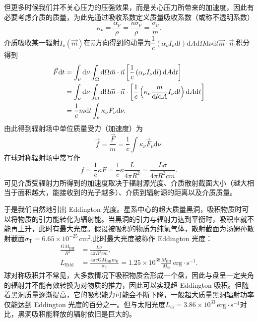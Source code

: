 \documentclass[../天体物理基础.tex]{subfiles}
\begin{document}
但更多时候我们并不关心压力的压强效果，而是关心压力所带来的加速度，因此有必要考虑介质的质量，为此先通过吸收系数定义质量吸收系数（或称不透明系数）
\begin{equation}
\kappa_\nu=\frac{\alpha_\nu}\rho=\frac{n\sigma_{\nu}}{\rho}=\frac{\sigma_\nu}{m}.
\end{equation}
介质吸收某一辐射$I_{\nu}\left(\vec{m}\right)$在$\vec n$方向得到的动量为$\dfrac{1}{c}\left(\alpha_\nu I_\nu\mathrm{d}l\right)\mathrm{d}A\mathrm{d}\Omega\mathrm{d}\nu\mathrm{d}t\vec{m}\cdot\vec{n}$,积分得到
\begin{align}
\vec{F}\mathrm{d}t&=\int_{\nu}\mathrm{d}\nu\int_{\Omega}\mathrm{d}\Omega\vec{m}\cdot\vec{n}\left[\frac{1}{c}\left(\alpha_{\nu}I_{\nu}\mathrm{d}l\right)\mathrm{d}A\mathrm{d}t\right]\notag\\
&=\int_{\nu}\mathrm{d}\nu\int_{\Omega}\mathrm{d}\Omega\vec{m}\cdot\vec{n}\cdot\left[\frac{1}{c}\left(\kappa_{\nu}\frac{m}{\mathrm{d}l\mathrm{d}A}I_{\nu}\mathrm{d}l\right)\mathrm{d}A\mathrm{d}t\right]\notag\\
&=\frac{1}{c}m\mathrm{d}t\int_{\nu}\kappa_{\nu}F_{\nu}\mathrm{d}\nu.
\end{align}
由此得到辐射场中单位质量受力（加速度）为
\begin{equation}
\vec{f}=\frac{\vec{F}}{m}=\frac{1}{c}\int\kappa_{\nu}\vec{F}_{\nu}\mathrm{d}\nu.
\end{equation}
在球对称辐射场中常写作
\begin{equation}
f=\frac{1}{c}\kappa F=\frac{1}{c}\kappa\dfrac{L}{4\pi R^2}=\frac{L\sigma}{4\pi R^{2}cm}.
\end{equation}
可见介质受辐射力所得到的加速度取决于辐射源光度、介质散射截面大小（越大相当于面积越大，能接收到的光子越多）、介质到辐射源的距离以及介质质量。

于是我们自然地引出 Eddington 光度。星系中心的超大质量黑洞，吸积物质时可以将物质的引力能转化为辐射能。当黑洞的引力与辐射力达到平衡时，吸积率就不能再上升，此时有最大光度。假设被吸积的物质为纯氢气体，散射截面为汤姆孙散射截面$\sigma_{\text{T}}=6.65\times10^{-25}\,\mathrm{cm}^{2}$,此时最大光度被称作 Eddington 光度：
\begin{align}
\frac{\mathrm{G}M_{\text{BH}}}{R^{2}}&=\frac{L\sigma}{4\pi R^{2}cm},\\
L_{\text{Edd}}&=\frac{4\pi c\mathrm{G}M_{\text{BH}}m_{\mathrm{H}}}{\sigma_{\text{T}}}=1.25\times10^{38}\frac{M_{\text{BH}}}{M_\odot}\,\mathrm{erg\cdot{}s^{-1}}.
\end{align}
球对称吸积并不常见，大多数情况下吸积物质会形成一个盘，因此与盘呈一定夹角的辐射并不能有效转换为对物质的推力，因此可以实现超 Eddington 吸积。但随着黑洞质量逐渐提高，它的吸积能力可能会不断下降，一般超大质量黑洞辐射功率仅能达到 Eddington 光度的百分之一。但与太阳光度$L_{\odot}=3.86\times10^{33}\,\mathrm{erg\cdot s^{-1}}$对比，黑洞吸积能释放的辐射依旧是巨大的。
\end{document}
